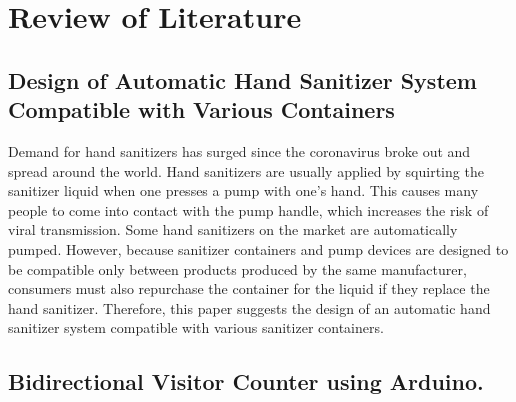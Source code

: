\chapter{Review of Literature}
\section{Design of Automatic Hand Sanitizer System Compatible with Various Containers}
\vspace{1cm} 
 
 \hspace{0.5cm} Demand for hand sanitizers has surged since the coronavirus broke out and spread around the world. Hand sanitizers are usually applied by squirting the sanitizer liquid when one presses a pump with one’s hand. This causes many people to come into contact with the pump handle, which increases the risk of viral transmission. Some hand sanitizers on the market are automatically pumped. However, because sanitizer containers and pump devices are designed to be compatible only between products produced by the same manufacturer, consumers must also repurchase the container for the liquid if they replace the hand sanitizer. Therefore, this paper suggests the design of an automatic hand sanitizer system compatible with various sanitizer containers.

 
 
  \newpage
 \section{Bidirectional Visitor Counter using Arduino.}
 \vspace{1cm} 
 
